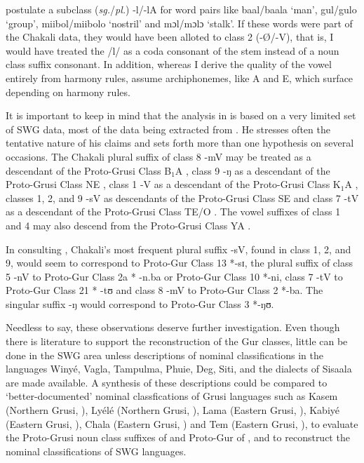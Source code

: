 \begin{exe}
\begin{exe}
\begin{exe}
{\begin{exe}
\begin{exe}
\begin{exe}
\begin{exe}
{ \citet[7]{Mcgi99} postulate a subclass  ({\it sg.}/{\it pl.})  {\sls -l/-lA} 
for 
word pairs like {\sls baal/baala} `man', {\sls gul/gulo} `group', 
{\sls miibol/miibolo} `nostril' and  {\sls mɔl/mɔlɔ} `stalk'. If these words 
were 
part
of the
Chakali data, they would have been alloted to class 2 ({\sls -\O/-V}), that is,
I would have treated the /l/ as a coda consonant of the stem instead of a noun
class
suffix consonant. In addition, whereas I derive the quality of the vowel
entirely from harmony rules,  \citeauthor{Mcgi99} assume archiphonemes, like A
and E, which surface depending on harmony rules.}

It is important to keep in mind that the analysis in \citet{Mane69a, Mane69b} is
based on a very
limited set of SWG data,  most of the data being extracted from
\citet{Bend65}. He
stresses often the tentative nature of his claims and  sets forth more than one
 hypothesis on several occasions. The Chakali plural suffix of class 8 {\sls 
-mV}
may be treated as a descendant of the Proto-Grusi Class {\sls *B$_{1}$A}
\citep[32]{Mane69b}, class 9 {\sls -ŋ} as a descendant of the Proto-Grusi Class
{\sls *NE}   \citep[37, 41]{Mane69b}, class 1 {\sls -V} as a descendant of the
Proto-Grusi
Class {\sls *K$_{1}$A}  \citep[39]{Mane69b}, classes 1, 2, and 9 {\sls -sV} as 
descendants
of the Proto-Grusi Class  {\sls *SE}  \citep[39]{Mane69b} and class 7 {\sls 
-tV} 
as
a descendant of the Proto-Grusi Class {\sls *TE/O}  \citep[43]{Mane69b}. The 
vowel
suffixes of class 1 and 4 may also descend from the Proto-Grusi Class {\sls *YA}
\citep[34]{Mane69b}. 

In consulting \citet[7--22]{Mieh07}, Chakali's  most frequent plural suffix  
{\sls -sV}, found in class 1, 2, and 9, would seem to correspond to Proto-Gur 
Class 13
*{\sls -sɪ}, the plural suffix of class 5 {\sls -nV} to  Proto-Gur Class 2a 
*{\sls 
-n.ba}
or Proto-Gur Class 10 *{\sls -ni}, class 7 {\sls -tV} to Proto-Gur Class 21 
*{\sls 
-tʊ} and class 8  {\sls -mV}  to Proto-Gur Class 2 *{\sls -ba}. The singular 
suffix
{\sls -ŋ} would correspond to Proto-Gur Class 3 *{\sls -ŋʊ}.


Needless to say, these observations  deserve further investigation. Even though
there is  literature to support the reconstruction of the Gur classes, little
can be done in the SWG
area unless descriptions of  nominal classifications in the languages  Winyé,
Vagla, Tampulma, Phuie,  Deg, Siti,  and the dialects of Sisaala  are made 
available. A synthesis of these
descriptions could be
compared to  `better-documented' nominal classfications of Grusi languages 
such as Kasem (Northern Grusi, \citet{Awed79, Bonv88, Awed03}),  Lyélé (Northern
Grusi, \citet{Delp79}),  Lama  (Eastern Grusi, \citet{Arit87, Ours89}), Kabiyé
(Eastern Grusi, \citet{Tcha07}),  Chala   (Eastern Grusi, \citet{Klei00}) and 
Tem
(Eastern Grusi, \citet{Tcha72, Tcha07}), to evaluate the Proto-Grusi noun class
suffixes of \citet{Mane69b} and Proto-Gur of \citet{Mieh07}, and to reconstruct
the nominal classifications of SWG  languages.



\end{exe}
\end{exe}
\end{exe}
\end{exe}}
\end{exe}
\end{exe}
\end{exe}

